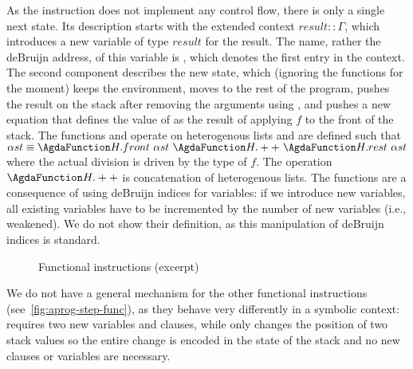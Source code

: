 As the instruction does not implement any control flow, there is only
a single next state. Its description starts with the extended context
$result :: \Gamma$, which introduces a new variable of type $result$
for the result. The name, rather the deBruijn address, of this
variable is \AZERO, which denotes the first entry in the context. The
second component describes the new state, which (ignoring the
 functions for the moment) keeps the environment, moves to
the rest of the program, pushes the result on the stack after removing
the arguments using , and pushes a new equation that
defines the value of {\AZERO} as the result of applying $f$ to the
front of the stack.
The functions  and  operate on heterogenous
lists and are defined such that
$\Aast \equiv \AFun{H.front}~\Aast~\AFun{H.++}~\AFun{H.rest}~\Aast$ where
the actual division is driven by the type of $f$. The operation
$\AFun{H.++}$ is concatenation of heterogenous lists.
The  functions are a consequence of using deBruijn indices
for variables: if we introduce new variables, all existing variables
have to be incremented by the number of new variables (i.e.,
weakened). We do not show their definition, 
as this manipulation of deBruijn indices is standard.


\begin{figure}[tp]
  \AbstractProgStepUNPAIR
  \AbstractProgStepSWAP
  \AbstractProgStepPUSH
  \caption{Functional instructions (excerpt)}
  \label{fig:aprog-step-func}
\end{figure}

\begin{comment}
  The matching representing the stack can be split implicitly just
  like the stack interpretation during concrete execution.  \verb/n∈/
  is another Agda pattern synonym for the n'th element of the context.
  Whenever the context is extended during symbolic execution, all
  elements of the abstract program state that do not change must be
  weakened so they can be parameterized by the new context.
\end{comment}
We do not have a general mechanism for the other functional
instructions (see~\autoref{fig:aprog-step-func}), as they behave very differently in a symbolic context:
 requires two new variables and clauses, while
 only changes the position of two stack values
so the entire change is encoded in the state of the stack
and no new clauses or variables are necessary.

